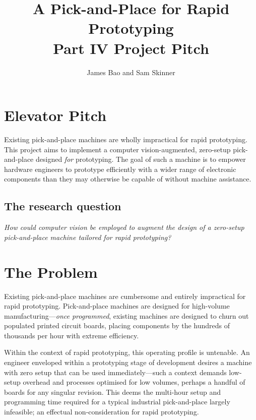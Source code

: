 \documentclass[a4paper, 11pt]{article}
\title{A Pick-and-Place for Rapid Prototyping\\\medskip Part IV Project Pitch}
\author{James Bao and Sam Skinner}
\begin{document}
\maketitle

\section{Elevator Pitch}

Existing pick-and-place machines are wholly impractical for rapid prototyping.
This project aims to implement a computer vision-augmented, zero-setup pick-and-place designed \emph{for} prototyping.
The goal of such a machine is to empower hardware engineers to prototype efficiently with a wider range of electronic components than they may otherwise be capable of without machine assistance.

\subsection{The research question}

\emph{How could computer vision be employed to augment the design of a zero-setup pick-and-place machine tailored for rapid prototyping?}

\tableofcontents

\pagebreak
{}

\section{The Problem}

Existing pick-and-place machines are cumbersome and entirely impractical for rapid prototyping.
Pick-and-place machines are designed for high-volume manufacturing—\emph{once programmed}, existing machines are designed to churn out populated printed circuit boards, placing components by the hundreds of thousands per hour \cite{cite:ztar-ysm40r} with extreme efficiency.

Within the context of rapid prototyping, this operating profile is untenable.
An engineer enveloped within a prototyping stage of development desires a machine with zero setup that can be used immediately—such a context demands low-setup overhead and processes optimised for low volumes, perhaps a handful of boards for any singular revision.
This deems the multi-hour setup and programming time \cite{cite:setup-time-reduction} required for a typical industrial pick-and-place largely infeasible; an effectual non-consideration for rapid prototyping.
\end{document}
